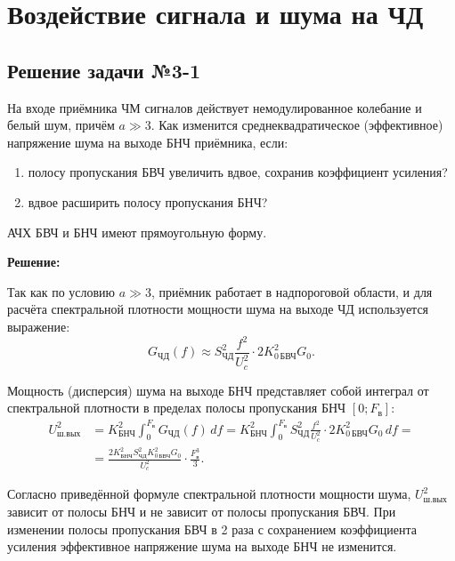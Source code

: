 \section{Воздействие сигнала и шума на ЧД}

\subsection{Решение задачи №3-1}

На входе приёмника ЧМ сигналов действует немодулированное колебание и белый шум, причём $a \gg 3$. Как изменится среднеквадратическое (эффективное) напряжение шума на выходе БНЧ приёмника, если:
\begin{enumerate}
    \item полосу пропускания БВЧ увеличить вдвое, сохранив коэффициент усиления? 
    \item вдвое расширить полосу пропускания БНЧ? 
\end{enumerate}
АЧХ БВЧ и БНЧ имеют прямоугольную форму.

\medskip
\noindent\textbf{Решение:}

Так как по условию $a \gg 3$, приёмник работает в надпороговой области, и для расчёта спектральной плотности мощности шума на выходе ЧД используется выражение:
\begin{equation}
    G_{\text{ЧД}}(f) \approx S_{\text{ЧД}}^2 \frac{f^2}{U_c^2} \cdot 2 K_{0\,\text{БВЧ}}^2 G_0.
\end{equation}

Мощность (дисперсия) шума на выходе БНЧ представляет собой интеграл от спектральной плотности в пределах полосы пропускания БНЧ $[0; F_{\text{в}}]$:
\begin{equation}
\begin{aligned}
    U_{\text{ш.вых}}^2 &= K_{\text{БНЧ}}^2 \int_0^{F_{\text{в}}} G_{\text{ЧД}}(f)\,df = K_{\text{БНЧ}}^2 \int_0^{F_{\text{в}}} S_{\text{ЧД}}^2 \frac{f^2}{U_c^2} \cdot 2 K_{0\,\text{БВЧ}}^2 G_0\,df = \\
    &= \frac{2 K_{\text{БНЧ}}^2 S_{\text{ЧД}}^2 K_{0\,\text{БВЧ}}^2 G_0}{U_c^2} \cdot \frac{F_{\text{в}}^3}{3}.
\end{aligned}
\end{equation}

    Согласно приведённой формуле спектральной плотности мощности шума, $U_{\text{ш.вых}}^2$ зависит от полосы БНЧ и не зависит от полосы пропускания БВЧ. При изменении полосы пропускания БВЧ в 2 раза с сохранением коэффициента усиления эффективное напряжение шума на выходе БНЧ не изменится.
    
